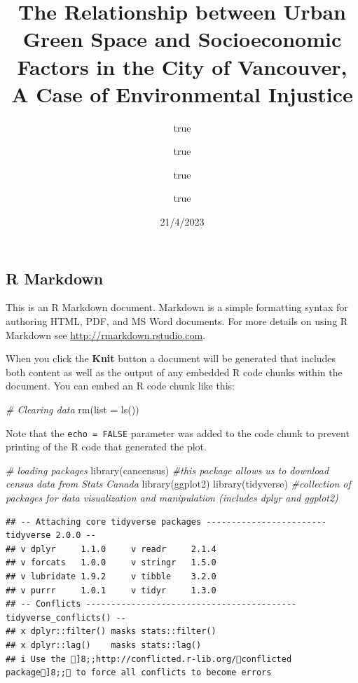\documentclass[
]{article}
\title{The Relationship between Urban Green Space and Socioeconomic
Factors in the City of Vancouver, A Case of Environmental Injustice}
\author{true \and true \and true \and true}
\date{21/4/2023}
\newenvironment{Shaded}{\begin{snugshade}}{\end{snugshade}}
\newcommand{\AttributeTok}[1]{\textcolor[rgb]{0.77,0.63,0.00}{#1}}
\newcommand{\CommentTok}[1]{\textcolor[rgb]{0.56,0.35,0.01}{\textit{#1}}}
\newcommand{\FunctionTok}[1]{\textcolor[rgb]{0.00,0.00,0.00}{#1}}
\newcommand{\NormalTok}[1]{#1}
\begin{document}
\maketitle

\hypertarget{r-markdown}{%
\subsection{R Markdown}\label{r-markdown}}

This is an R Markdown document. Markdown is a simple formatting syntax
for authoring HTML, PDF, and MS Word documents. For more details on
using R Markdown see \url{http://rmarkdown.rstudio.com}.

When you click the \textbf{Knit} button a document will be generated
that includes both content as well as the output of any embedded R code
chunks within the document. You can embed an R code chunk like this:

\begin{Shaded}
\begin{Highlighting}[]
\CommentTok{\# Clearing data}
\FunctionTok{rm}\NormalTok{(}\AttributeTok{list =} \FunctionTok{ls}\NormalTok{())}
\end{Highlighting}
\end{Shaded}

Note that the \texttt{echo\ =\ FALSE} parameter was added to the code
chunk to prevent printing of the R code that generated the plot.

\begin{Shaded}
\begin{Highlighting}[]
\CommentTok{\# loading packages}
\FunctionTok{library}\NormalTok{(cancensus) }\CommentTok{\#this package allows us to download census data from Stats Canada}
\FunctionTok{library}\NormalTok{(ggplot2) }
\FunctionTok{library}\NormalTok{(tidyverse) }\CommentTok{\#collection of packages for data visualization and manipulation (includes dplyr and ggplot2)}
\end{Highlighting}
\end{Shaded}

\begin{verbatim}
## -- Attaching core tidyverse packages ------------------------ tidyverse 2.0.0 --
## v dplyr     1.1.0     v readr     2.1.4
## v forcats   1.0.0     v stringr   1.5.0
## v lubridate 1.9.2     v tibble    3.2.0
## v purrr     1.0.1     v tidyr     1.3.0
## -- Conflicts ------------------------------------------ tidyverse_conflicts() --
## x dplyr::filter() masks stats::filter()
## x dplyr::lag()    masks stats::lag()
## i Use the ]8;;http://conflicted.r-lib.org/conflicted package]8;; to force all conflicts to become errors
\end{verbatim}
\end{document}
